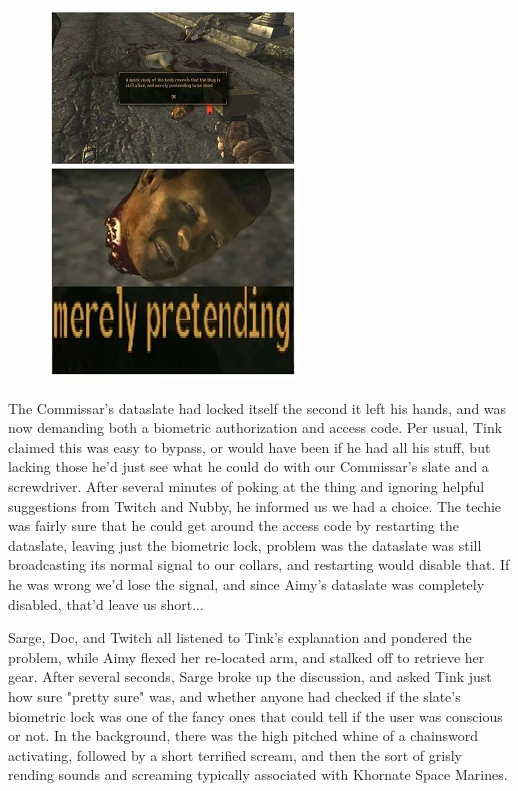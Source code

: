 \begin{figure}
	\begin{center}
		\includegraphics[width=\figwidth]{pics/21/66.png}
	\end{center}
\end{figure}
The Commissar's dataslate had locked itself the second it left his hands, and was now demanding both a biometric authorization and access code. 
Per usual, Tink claimed this was easy to bypass, or would have been if he had all his stuff, but lacking those he'd just see what he could do with our Commissar's slate and a screwdriver. 
After several minutes of poking at the thing and ignoring helpful suggestions from Twitch and Nubby, he informed us we had a choice. 
The techie was fairly sure that he could get around the access code by restarting the dataslate, leaving just the biometric lock, problem was the dataslate was still broadcasting its normal signal to our collars, and restarting would disable that. 
If he was wrong we'd lose the signal, and since Aimy's dataslate was completely disabled, that'd leave us short...

Sarge, Doc, and Twitch all listened to Tink's explanation and pondered the problem, while Aimy flexed her re-located arm, and stalked off to retrieve her gear. 
After several seconds, Sarge broke up the discussion, and asked Tink just how sure "pretty sure" was, and whether anyone had checked if the slate's biometric lock was one of the fancy ones that could tell if the user was conscious or not. 
In the background, there was the high pitched whine of a chainsword activating, followed by a short terrified scream, and then the sort of grisly rending sounds and screaming typically associated with Khornate Space Marines. 


